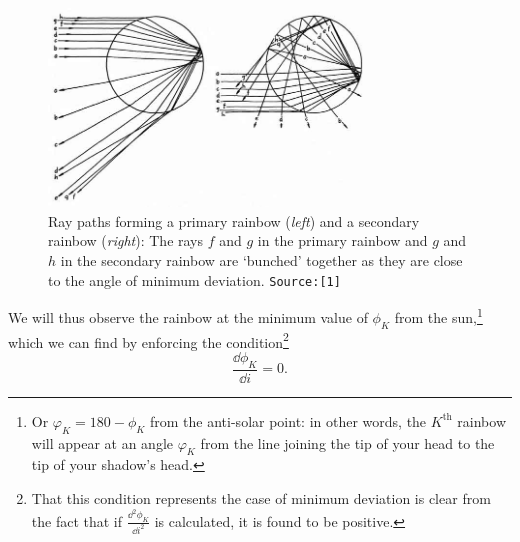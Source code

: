 

\begin{figure}[!htb]
    \centering
    \includegraphics[width=0.75\textwidth]{figs/rainbowDeviation.jpeg}
    \caption{Ray paths forming a primary rainbow (\textit{left}) and a secondary rainbow (\textit{right}): The rays $f$ and $g$ in the primary rainbow and $g$ and $h$ in the secondary rainbow are `bunched' together as they are close to the angle of minimum deviation. \texttt{Source:[1]}}
    \label{fig:rainbowDeviation}
\end{figure}



We will thus observe the rainbow at the minimum value of $\phi_K$ from the sun,\footnote{Or $\varphi_K = 180 - \phi_K$ from the anti-solar point: in other words, the $K^\text{th}$ rainbow will appear at an angle $\varphi_K$ from the line joining the tip of your head to the tip of your shadow's head.} which we can find by enforcing the condition\footnote{That this condition represents the case of minimum deviation is clear from the fact that if $\frac{\dd^2 \phi_K}{\dd i^2}$ is calculated, it is found to be positive.}  $$\frac{\dd\phi_K}{\dd i}=0.$$

